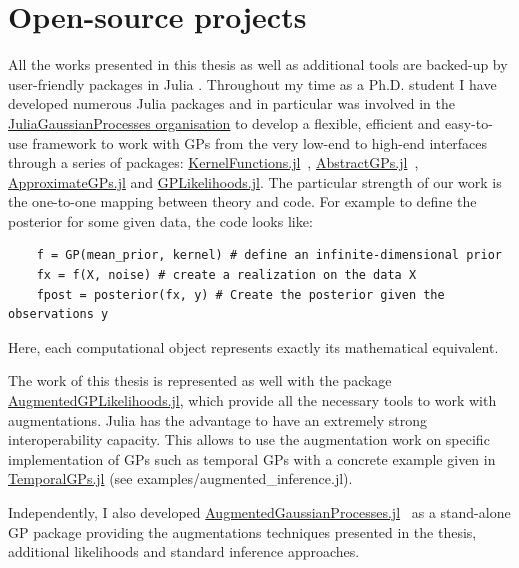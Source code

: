 \section{Open-source projects}

All the works presented in this thesis as well as additional tools are backed-up by user-friendly packages in Julia \cite{Julia-2017}.
Throughout my time as a Ph.D. student I have developed numerous Julia packages and in particular was involved in the \href{https://github.com/JuliaGaussianProcesses}{JuliaGaussianProcesses organisation} to develop a flexible, efficient and easy-to-use framework to work with \ac{GPs} from the very low-end to high-end interfaces through a series of packages: \href{https://github.com/JuliaGaussianProcesses/KernelFunctions.jl}{KernelFunctions.jl}~\cite{theo_galy_fajou_2022_6246597}, \href{https://github.com/JuliaGaussianProcesses/AbstractGPs.jl}{AbstractGPs.jl}~\cite{david_widmann_2022_5939997}, \href{https://github.com/JuliaGaussianProcesses/ApproximateGPs.jl}{ApproximateGPs.jl} and \href{https://github.com/JuliaGaussianProcesses/GPLikelihoods.jl}{GPLikelihoods.jl}.
The particular strength of our work is the one-to-one mapping between theory and code.
For example to define the posterior for some given data, the code looks like:
\begin{verbatim}
    f = GP(mean_prior, kernel) # define an infinite-dimensional prior
    fx = f(X, noise) # create a realization on the data X
    fpost = posterior(fx, y) # Create the posterior given the observations y
\end{verbatim}
Here, each computational object represents exactly its mathematical equivalent.

The work of this thesis is represented as well with the package \href{https://github.com/JuliaGaussianProcesses/AugmentedGPLikelihoods.jl}{AugmentedGPLikelihoods.jl}, which provide all the necessary tools to work with augmentations.
Julia has the advantage to have an extremely strong interoperability capacity.
This allows to use the augmentation work on specific implementation of \ac{GPs} such as temporal \ac{GPs} with a concrete example given in \href{https://github.com/JuliaGaussianProcesses/TemporalGPs.jl}{TemporalGPs.jl} (see examples/augmented\_inference.jl).

Independently, I also developed \href{https://github.com/theogf/AugmentedGaussianProcesses.jl}{AugmentedGaussianProcesses.jl}~\cite{theo_galy_fajou_2021_5728215} as a stand-alone \ac{GP} package providing the augmentations techniques presented in the thesis, additional likelihoods and standard inference approaches.

